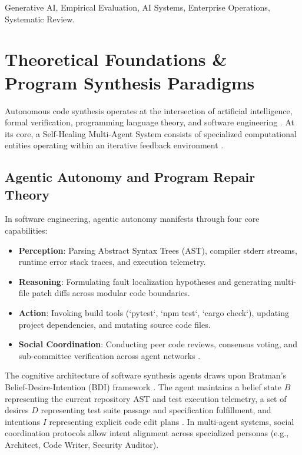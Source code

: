 \documentclass[10pt,journal,compsoc,twocolumn]{IEEEtran}
\begin{document}
\begin{IEEEkeywords}
Generative AI, Empirical Evaluation, AI Systems, Enterprise Operations, Systematic Review.
\end{IEEEkeywords}




\section{Theoretical Foundations \& Program Synthesis Paradigms}


Autonomous code synthesis operates at the intersection of artificial intelligence, formal verification, programming language theory, and software engineering \cite{bratman1987}. At its core, a Self-Healing Multi-Agent System consists of specialized computational entities operating within an iterative feedback environment \cite{wooldridge2009}.


\subsection{Agentic Autonomy and Program Repair Theory}

In software engineering, agentic autonomy manifests through four core capabilities:
\begin{itemize}
  \item \textbf{Perception}: Parsing Abstract Syntax Trees (AST), compiler stderr streams, runtime error stack traces, and execution telemetry.
  \item \textbf{Reasoning}: Formulating fault localization hypotheses and generating multi-file patch diffs across modular code boundaries.
  \item \textbf{Action}: Invoking build tools (`pytest`, `npm test`, `cargo check`), updating project dependencies, and mutating source code files.
  \item \textbf{Social Coordination}: Conducting peer code reviews, consensus voting, and sub-committee verification across agent networks \cite{feuerriegel2023generativeai}.
\end{itemize}

The cognitive architecture of software synthesis agents draws upon Bratman's Belief-Desire-Intention (BDI) framework \cite{bratman1987}. The agent maintains a belief state $B$ representing the current repository AST and test execution telemetry, a set of desires $D$ representing test suite passage and specification fulfillment, and intentions $I$ representing explicit code edit plans \cite{arxiv_2302_10809}. In multi-agent systems, social coordination protocols allow intent alignment across specialized personas (e.g., Architect, Code Writer, Security Auditor).
\end{document}
